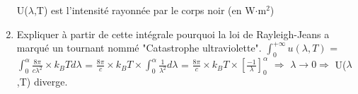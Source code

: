 \documentclass{article}
\begin{document}
\begin{enumerate}
    U($\lambda$,T) est l'intensité rayonnée par le corps noir (en W$\cdot$m$^{2}$)
    \item Expliquer à partir de cette intégrale pourquoi la loi de Rayleigh-Jeans a marqué un tournant nommé "Catastrophe ultraviolette".\newline\newline\newline
    $\int_{0}^{+\infty} u(\lambda,T)$ = $\int_{0}^{\alpha} \frac{8\pi}{c\lambda^{2}}\times k_{B}T d\lambda$\newline\newline
    = $\frac{8\pi}{c}\times k_{B}T \times \int_{0}^{\alpha} \frac{1}{\lambda^{2}}d\lambda$ = $\frac{8\pi}{c}\times k_{B}T \times [\frac{-1}{\lambda}]_{0}^{\alpha}$\newline\newline
    $\Longrightarrow$ $\lambda \rightarrow 0 \Longrightarrow$ U($\lambda$,T) diverge.
\end{enumerate}
\end{document}
